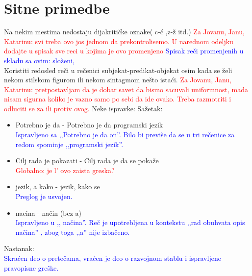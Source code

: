 \documentclass[a4paper]{report}
\newcommand{\odgovor}[1]{\textcolor{black}{#1}}
\newcommand{\odgovorAutora}[1]{\textcolor{blue}{#1}}
\newcommand{\note}[1]{\textcolor{red}{#1}}
\begin{document}
\section{Sitne primedbe}
Na nekim mestima nedostaju dijakritičke oznake( c-ć ,z-ž itd.)
\note{Za Jovanu, Janu, Katarinu: svi treba ovo jos jednom da prekontrolisemo. U narednom odeljku dodajte u spisak sve reci u kojima je ovo promenjeno} \odgovorAutora{Spisak reči promenjenih u skladu sa ovim: složeni, } \\
Koristiti redosled reči u rečenici subjekat-predikat-objekat osim kada se želi nekom stilskom figurom ili nekom sintagmom nešto istaći.
\note{Za Jovanu, Janu, Katarinu: pretpostavljam da je dobar savet da bismo sacuvali uniformnost, mada nisam sigurna koliko je vazno samo po sebi da ide ovako. Treba razmotriti i odluciti se za ili protiv ovog.}\newline
Neke ispravke:\newline
Sažetak:
\begin{itemize}
  \item Potrebno je da - Potrebno je da programski jezik \\
  \odgovorAutora{Ispravljeno sa ,,Potrebno je da on''. Bilo bi previše da se u tri rečenice za redom spominje ,,programski jezik''.}
  \item Cilj rada je pokazati - Cilj rada je da se pokaže \\
  \note{Globalno: je l' ovo zaista greska?}
  \item  jezik, a kako  -  jezik, kako se \\
  \odgovorAutora{Preglog je usvojen.}
  \item  nacina - način (bez a) \\
  \odgovorAutora{Ispravljeno u ,, načina''. Reč je upotrebljena u kontekstu ,,rad obuhvata opis načina'' , zbog toga ,,a'' nije izbačeno.}
\end{itemize}
Nastanak: \\
\odgovorAutora{Skraćen deo o pretečama, vraćen je deo o razvojnom stablu i ispravljene pravopisne greške.}
\end{document}
